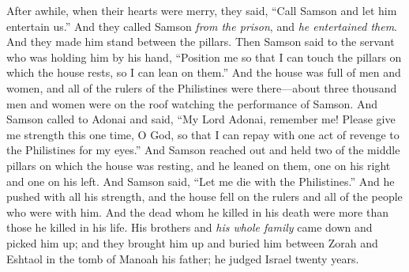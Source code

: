 \begin{biblechapter}
\verse After awhile, when their hearts were merry, they said, “Call Samson and let him entertain us.” And they called Samson \textit{from the prison}, and \textit{he entertained them}. And they made him stand between the pillars.
\verse Then Samson said to the servant who was holding him by his hand, “Position me so that I can touch the pillars on which the house rests, so I can lean on them.”
\verse And the house was full of men and women, and all of the rulers of the Philistines were there—about three thousand men and women were on the roof watching the performance of Samson.
 And Samson called to Adonai and said, “My Lord Adonai, remember me! Please give me strength this one time, O God, so that I can repay with one act of revenge to the Philistines for my eyes.”
\verse And Samson reached out and held two of the middle pillars on which the house was resting, and he leaned on them, one on his right and one on his left.
\verse And Samson said, “Let me die with the Philistines.” And he pushed with all his strength, and the house fell on the rulers and all of the people who were with him. And the dead whom he killed in his death were more than those he killed in his life.
\verse His brothers and \textit{his whole family} came down and picked him up; and they brought him up and buried him between Zorah and Eshtaol in the tomb of Manoah his father; he judged Israel twenty years.
\end{biblechapter}

